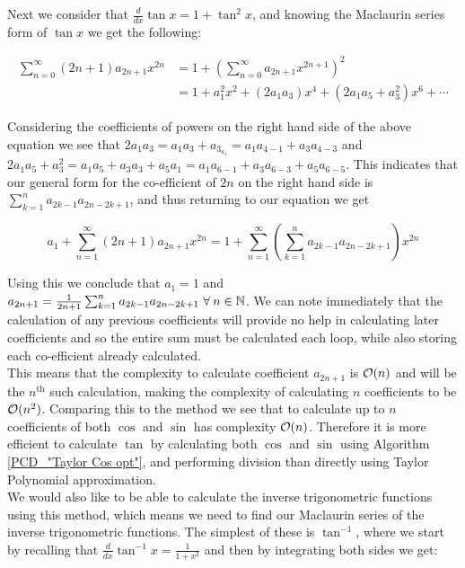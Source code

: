 {Next we consider that \(\frac{d}{dx} \tan x = 1 + \tan^2 x\), and knowing the Maclaurin series form of \(\tan x\) we get the following:

\begin{displaymath}
\begin{align*}
	\sum_{n=0}^\infty (2n+1)a_{2n+1}x^{2n} &= 1 + 
		(\sum_{n=0}^\infty a_{2n+1}x^{2n+1})^2\\
	&= 1 + a_1^2x^2 + (2a_1a_3)x^4 + (2a_1a_5 + a_3^2)x^6 + \cdots
\end{align*}
\end{displaymath}

Considering the coefficients of powers on the right hand side of the above equation we see that \(2a_1a_3 = a_1a_3 + a_3_a_1 = a_1a_{4-1} + a_3a_{4-3}\) and \(2a_1a_5 + a_3^2 = a_1a_5 + a_3a_3 + a_5a_1 = a_1a_{6-1} + a_3a_{6-3} +a_5a_{6-5}\). This indicates that our general form for the co-efficient of \(2n\) on the right hand side is \(\sum_{k=1}^n a_{2k-1}a_{2n - 2k + 1}\), and thus returning to our equation we get

\[a_1 + \sum_{n=1}^\infty (2n+1)a_{2n+1}x^{2n} = 1 + \sum_{n=1}^\infty(\sum_{k=1}^n a_{2k-1}a_{2n-2k+1})x^{2n}\]

Using this we conclude that \(a_1 = 1\) and \(a_{2n+1} = \frac{1}{2n+1}\sum_{k=1}^n a_{2k-1}a_{2n-2k+1}\ \forall\: n \in \mathbb{N}\). We can note immediately that the calculation of any previous coefficients will provide no help in calculating later coefficients and so the entire sum must be calculated each loop, while also storing each co-efficient already calculated.\\

This means that the complexity to calculate coefficient \(a_{2n+1}\) is \(\mathcal{O}(n)\) and will be the \(n^\text{th}\) such calculation, making the complexity of calculating \(n\) coefficients to be \(\mathcal{O}(n^2)\). Comparing this to the  method we see that to calculate up to \(n\) coefficients of both \(\cos\) and \(\sin\) has complexity \(\mathcal{O}(n)\). Therefore it is more efficient to calculate \(\tan\) by calculating both \(\cos\) and \(\sin\) using Algorithm \ref{PCD_"Taylor Cos opt"}, and performing division than directly using Taylor Polynomial approximation.\\

We would also like to be able to calculate the inverse trigonometric functions using this method, which means we need to find our Maclaurin series of the inverse trigonometric functions. The simplest of these is \(\tan^{-1}\), where we start by recalling that \(\frac{d}{dx} \tan^{-1} x = \frac{1}{1+x^2}\) and then by integrating both sides we get:

}
